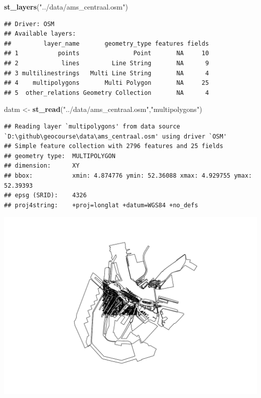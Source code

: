 \documentclass[ignorenonframetext,]{beamer}
\newenvironment{Shaded}{\begin{snugshade}}{\end{snugshade}}
\newcommand{\KeywordTok}[1]{\textcolor[rgb]{0.26,0.66,0.93}{\textbf{#1}}}
\newcommand{\NormalTok}[1]{\textcolor[rgb]{0.74,0.68,0.62}{#1}}
\newcommand{\OperatorTok}[1]{\textcolor[rgb]{0.74,0.68,0.62}{#1}}
\newcommand{\StringTok}[1]{\textcolor[rgb]{0.02,0.61,0.04}{#1}}
\begin{document}
\begin{frame}[fragile]{}
\protect\hypertarget{section}{}

\begin{Shaded}
\begin{Highlighting}[]
\KeywordTok{st_layers}\NormalTok{(}\StringTok{"../data/ams_centraal.osm"}\NormalTok{)}
\end{Highlighting}
\end{Shaded}

\begin{verbatim}
## Driver: OSM 
## Available layers:
##         layer_name       geometry_type features fields
## 1           points               Point       NA     10
## 2            lines         Line String       NA      9
## 3 multilinestrings   Multi Line String       NA      4
## 4    multipolygons       Multi Polygon       NA     25
## 5  other_relations Geometry Collection       NA      4
\end{verbatim}

\begin{Shaded}
\begin{Highlighting}[]
\NormalTok{datm <-}\StringTok{ }\KeywordTok{st_read}\NormalTok{(}\StringTok{"../data/ams_centraal.osm"}\NormalTok{,}\StringTok{"multipolygons"}\NormalTok{)}
\end{Highlighting}
\end{Shaded}

\begin{verbatim}
## Reading layer `multipolygons' from data source `D:\github\geocourse\data\ams_centraal.osm' using driver `OSM'
## Simple feature collection with 2796 features and 25 fields
## geometry type:  MULTIPOLYGON
## dimension:      XY
## bbox:           xmin: 4.874776 ymin: 52.36088 xmax: 4.929755 ymax: 52.39393
## epsg (SRID):    4326
## proj4string:    +proj=longlat +datum=WGS84 +no_defs
\end{verbatim}

\begin{Shaded}
\end{Shaded}

\includegraphics{B3_osm_mainapi_files/figure-beamer/unnamed-chunk-36-1.pdf}


\end{frame}
\end{document}
